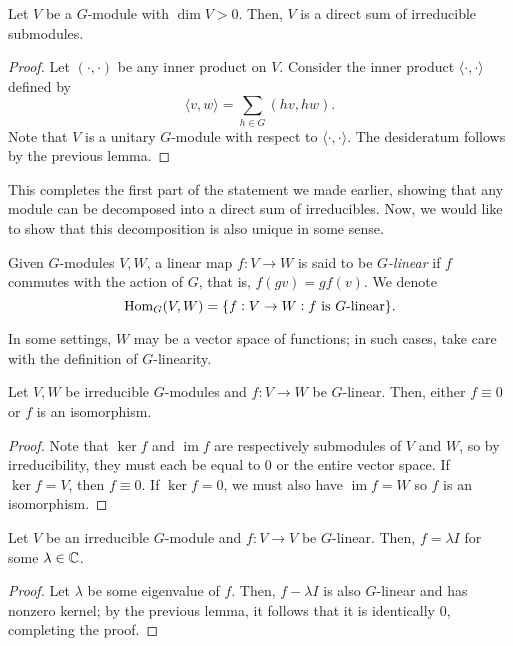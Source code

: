 	\begin{flem}
		Let $V$ be a $G$-module with $\dim V > 0$. Then, $V$ is a direct sum of irreducible submodules.
	\end{flem}
	\begin{proof}
		Let $(\cdot,\cdot)$ be any inner product on $V$. Consider the inner product $\langle \cdot,\cdot\rangle$ defined by
		\[ \langle v,w\rangle = \sum_{h \in G} ( hv,hw ). \]
		Note that $V$ is a unitary $G$-module with respect to $\langle \cdot,\cdot\rangle$. The desideratum follows by the previous lemma.
	\end{proof}

	This completes the first part of the statement we made earlier, showing that any module can be decomposed into a direct sum of irreducibles. Now, we would like to show that this decomposition is also unique in some sense.

	\begin{fdef}
		Given $G$-modules $V,W$, a linear map $f : V \to W$ is said to be \emph{$G$-linear} if $f$ commutes with the action of $G$, that is, $f(gv) = gf(v)$. We denote
		\[ \operatorname{Hom}_G(V,W) = \{ f : V \to W : f \text{ is $G$-linear} \}. \]
	\end{fdef}

	In some settings, $W$ may be a vector space of functions; in such cases, take care with the definition of $G$-linearity.

	\begin{flem}
		Let $V,W$ be irreducible $G$-modules and $f : V \to W$ be $G$-linear. Then, either $f \equiv 0$ or $f$ is an isomorphism.
	\end{flem}
	\begin{proof}
		Note that $\ker f$ and $\operatorname{im} f$ are respectively submodules of $V$ and $W$, so by irreducibility, they must each be equal to $0$ or the entire vector space. If $\ker f = V$, then $f \equiv 0$. If $\ker f = 0$, we must also have $\operatorname{im} f = W$ so $f$ is an isomorphism.
	\end{proof}

	\begin{flem}
		\label{schur's lemma}
		Let $V$ be an irreducible $G$-module and $f : V \to V$ be $G$-linear. Then, $f = \lambda I$ for some $\lambda \in \mathbb{C}$.
	\end{flem}
	\begin{proof}
		Let $\lambda$ be some eigenvalue of $f$. Then, $f - \lambda I$ is also $G$-linear and has nonzero kernel; by the previous lemma, it follows that it is identically $0$, completing the proof.
	\end{proof}

